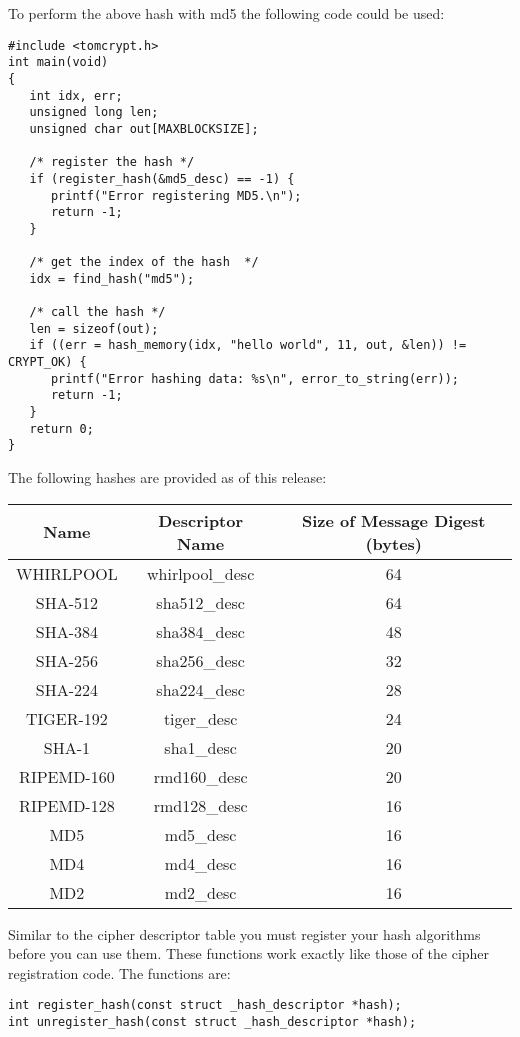 \documentclass[a4paper]{book}
\begin{document}
To perform the above hash with md5 the following code could be used:
\begin{small}
\begin{verbatim}
#include <tomcrypt.h>
int main(void)
{
   int idx, err;
   unsigned long len;
   unsigned char out[MAXBLOCKSIZE];

   /* register the hash */
   if (register_hash(&md5_desc) == -1) {
      printf("Error registering MD5.\n");
      return -1;
   }

   /* get the index of the hash  */
   idx = find_hash("md5");

   /* call the hash */
   len = sizeof(out);
   if ((err = hash_memory(idx, "hello world", 11, out, &len)) != CRYPT_OK) {
      printf("Error hashing data: %s\n", error_to_string(err));
      return -1;
   }
   return 0;
}
\end{verbatim}
\end{small}

The following hashes are provided as of this release:
\begin{center}
\begin{tabular}{|c|c|c|}
      \hline Name & Descriptor Name & Size of Message Digest (bytes) \\
      \hline WHIRLPOOL & whirlpool\_desc & 64 \\
      \hline SHA-512 & sha512\_desc & 64 \\
      \hline SHA-384 & sha384\_desc & 48 \\
      \hline SHA-256 & sha256\_desc & 32 \\
      \hline SHA-224 & sha224\_desc & 28 \\
      \hline TIGER-192 & tiger\_desc & 24 \\
      \hline SHA-1 & sha1\_desc & 20 \\
      \hline RIPEMD-160 & rmd160\_desc & 20 \\
      \hline RIPEMD-128 & rmd128\_desc & 16 \\
      \hline MD5 & md5\_desc & 16 \\
      \hline MD4 & md4\_desc & 16 \\
      \hline MD2 & md2\_desc & 16 \\
      \hline
\end{tabular}
\end{center}

Similar to the cipher descriptor table you must register your hash algorithms before you can use them.  These functions
work exactly like those of the cipher registration code.  The functions are:
 
\begin{verbatim}
int register_hash(const struct _hash_descriptor *hash);
int unregister_hash(const struct _hash_descriptor *hash);
\end{verbatim}
\end{document}
